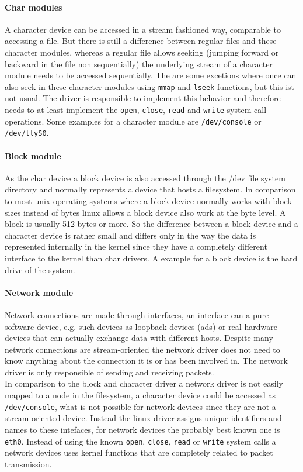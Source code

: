 \documentclass{sig-alternate-05-2015}
\begin{document}
\paragraph{Char modules}
A character device can be accessed in a stream fashioned way, comparable to accessing a file. But there is still a difference between regular files and these character modules, whereas a regular file allows seeking (jumping forward or backward in the file non sequentially) the underlying stream of a character module needs to be accessed sequentially. The are some excetions where once can also seek in these character modules using \texttt{mmap} and \texttt{lseek} functions, but this ist not usual. The driver is responsible to implement this behavior and therefore needs to at least implement the \texttt{open}, \texttt{close}, \texttt{read} and \texttt{write} system call operations. Some examples for a character module are \texttt{/dev/console} or \texttt{/dev/ttyS0}.

\paragraph{Block module}
As the char device a block device is also accessed through the /dev file system directory and normally represents a device that hosts a filesystem. In comparison to most unix operating systems where a block device normally works with block sizes instead of bytes linux allows a block device also work at the byte level. A block is usually 512 bytes or more. So the difference between a block device and a character device is rather small and differs only in the way the data is represented internally in the kernel since they have a completely different interface to the kernel than char drivers. A example for a block device is the hard drive of the system.

\paragraph{Network module}
Network connections are made through interfaces, an interface can a pure software device, e.g. such devices as loopback devices (ads) or real hardware devices that can actually exchange data with different hosts. Despite many network connections are stream-oriented the network driver does not need to know anything about the connection it is or has been involved in. The network driver is only responsible of sending and receiving packets. \\
In comparison to the block and character driver a network driver is not easily mapped to a node in the filesystem, a character device could be accessed as \texttt{/dev/console}, what is not possible for network devices since they are not a stream oriented device. Instead the linux driver assigns unique identifiers and names to these intefaces, for network devices the probably best known one is \texttt{eth0}. Instead of using the known \texttt{open}, \texttt{close}, \texttt{read} or \texttt{write} system calls a network devices uses kernel functions that are completely related to packet transmission. 
\end{document}
